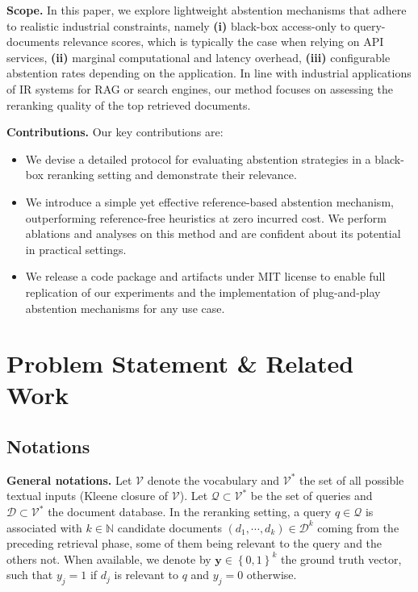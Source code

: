 \noindent \textbf{Scope.} In this paper, we explore lightweight abstention mechanisms that adhere to realistic industrial constraints, namely  \textbf{(i)} black-box access-only to query-documents relevance scores, which is typically the case when relying on API services, \textbf{(ii)} marginal computational and latency overhead, \textbf{(iii)} configurable abstention rates depending on the application. In line with industrial applications of IR systems for RAG or search engines, our method focuses on assessing the reranking quality of the top retrieved documents.

\noindent \textbf{Contributions.} Our key contributions are:

\begin{itemize}[noitemsep, topsep=-1mm, leftmargin=8mm]
\item We devise a detailed protocol for evaluating abstention strategies in a black-box reranking setting and demonstrate their relevance. 
\item We introduce a simple yet effective reference-based abstention mechanism, outperforming reference-free heuristics at zero incurred cost. We perform ablations and analyses on this method and are confident about its potential in practical settings.
\item We release a code package and artifacts  under MIT license to enable full replication of our experiments and the implementation of plug-and-play abstention mechanisms for any use case.
\end{itemize}


\section{Problem Statement \& Related Work}

\subsection{Notations}
\label{sec:notations}

\textbf{General notations.} Let $\mathcal{V}$ denote the vocabulary and $\mathcal{V}^*$ the set of all possible textual inputs (Kleene closure of $\mathcal{V}$). Let $\mathcal{Q} \subset \mathcal{V}^*$ be the set of queries and $\mathcal{D} \subset \mathcal{V}^*$ the document database. In the reranking setting, a query $q \in \mathcal{Q}$ is associated with $k \in \mathbb{N}$ candidate documents $ \left( d_1, \cdots, d_k \right) \in \mathcal{D}^k$ coming from the preceding retrieval phase, some of them being relevant to the query and the others not. When available, we denote by $\mathbf{y} \in \left\{0,1\right\}^k$ the ground truth vector, such that $y_j = 1$ if $d_j$ is relevant to $q$ and $y_j = 0$ otherwise.


